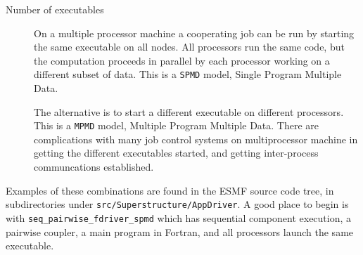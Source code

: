\begin{description}
\item[Number of executables]

On a multiple processor machine a cooperating job can be run 
by starting the same executable on all nodes.  All processors run the
same code, but the computation proceeds in parallel by each processor 
working on a different subset of data.  This is a {\tt SPMD} model, 
Single Program Multiple Data.  

The alternative is to start a different executable on different
processors.  This is a {\tt MPMD} model, Multiple Program Multiple Data.
There are complications with many job control systems on multiprocessor
machine in getting the different executables started, and getting
inter-process communcations established.

\end{description}

Examples of these combinations are found in the ESMF source code tree, in
subdirectories under {\tt src/Superstructure/AppDriver}.
A good place to begin is with
{\tt seq\_pairwise\_fdriver\_spmd} which
has sequential component execution, a pairwise coupler, a main program
in Fortran, and all processors launch the same executable.

